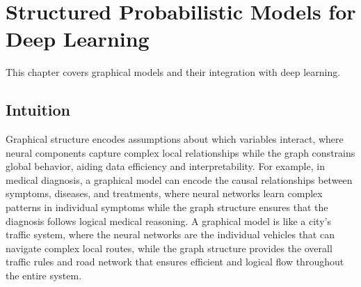 
\chapter{Structured Probabilistic Models for Deep Learning}
\label{chap:structured-probabilistic-models}

This chapter covers graphical models and their integration with deep learning.


\begin{learningobjectives}
\end{learningobjectives}



\section*{Intuition}

Graphical structure encodes assumptions about which variables interact, where neural components capture complex local relationships while the graph constrains global behavior, aiding data efficiency and interpretability. For example, in medical diagnosis, a graphical model can encode the causal relationships between symptoms, diseases, and treatments, where neural networks learn complex patterns in individual symptoms while the graph structure ensures that the diagnosis follows logical medical reasoning. A graphical model is like a city's traffic system, where the neural networks are the individual vehicles that can navigate complex local routes, while the graph structure provides the overall traffic rules and road network that ensures efficient and logical flow throughout the entire system.










